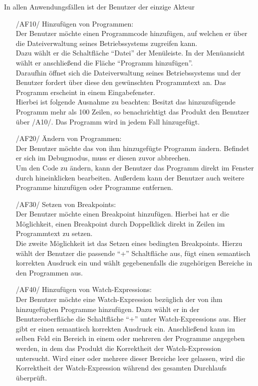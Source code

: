 \documentclass[parskip=full]{scrartcl}
\begin{document}
In allen Anwendungsfällen ist der Benutzer der einzige Akteur

\begin{itemize}
    \item [/AF10/] Hinzufügen von Programmen:\\ 
	Der Benutzer möchte einen Programmcode hinzufügen, auf welchen er über die Dateiverwaltung
	seines Betriebssystems zugreifen kann.\\
	Dazu wählt er die Schaltfläche \enquote{Datei} der Menüleiste. In der Menüansicht wählt er anschließend die Fläche \enquote{Programm hinzufügen}.\\
	Daraufhin öffnet sich die Dateiverwaltung seines Betriebssystems und der Benutzer fordert über diese den gewünschten Programmtext an.
	Das Programm erscheint in einem Eingabefenster.\\
	Hierbei ist folgende Ausnahme zu beachten: Besitzt das hinzuzufügende Programm mehr als 100 Zeilen, so benachrichtigt das Produkt den Benutzer über /A10/. Das Programm wird in jedem Fall hinzugefügt.\\
    
    \item [/AF20/] Ändern von Programmen:\\
    Der Benutzer möchte das von ihm hinzugefügte Programm ändern. Befindet er sich im \gls{Debugmodus}, muss er diesen zuvor abbrechen. \\
    Um den Code zu ändern, kann der Benutzer das Programm direkt im Fenster durch hineinklicken bearbeiten. Außerdem kann der Benutzer auch weitere Programme hinzufügen oder Programme entfernen.
    
    \item [/AF30/] Setzen von Breakpoints:\\
    Der Benutzer möchte einen \gls{Breakpoint} hinzufügen. Hierbei hat er die Möglichkeit, einen Breakpoint durch Doppelklick direkt in Zeilen im Programmtext zu setzen.\\
    Die zweite Möglichkeit ist das Setzen eines bedingten Breakpoints. Hierzu wählt der Benutzer die passende \enquote{+} Schaltfläche aus, fügt einen semantisch korrekten Ausdruck ein und wählt gegebenenfalls die zugehörigen Bereiche in den Programmen aus.
    
    \item [/AF40/] Hinzufügen von Watch-Expressions:\\
    Der Benutzer möchte eine \gls{Watch-Expression} bezüglich der von ihm hinzugefügten Programme hinzufügen. Dazu wählt er in der Benutzeroberfläche die Schaltfläche \enquote{+} unter Watch-Expressions aus. Hier gibt er einen semantisch korrekten %
Ausdruck ein. Anschließend kann im selben Feld ein Bereich in einem oder mehreren der Programme angegeben werden, in dem das Produkt die Korrektheit der Watch-Expression untersucht. Wird einer oder mehrere dieser Bereiche leer gelassen, wird die Korrektheit der Watch-Expression während des gesamten Durchlaufs überprüft.
    

\end{itemize}
\end{document}
